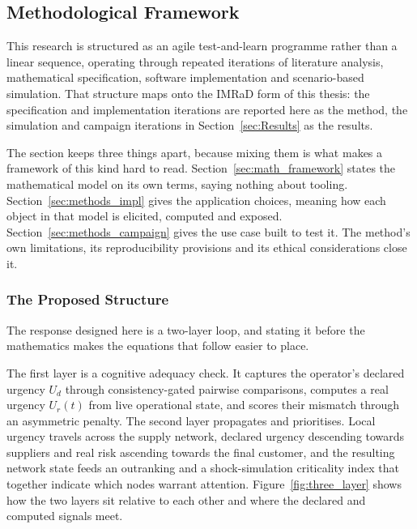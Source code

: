 \subsection{Methodological Framework}
\label{sec:methods_framework}

This research is structured as an agile test-and-learn programme rather than a linear
sequence, operating through repeated iterations of literature analysis, mathematical
specification, software implementation and scenario-based simulation. That structure maps
onto the IMRaD form of this thesis: the specification and implementation iterations are
reported here as the method, the simulation and campaign iterations in
Section~\ref{sec:Results} as the results.

The section keeps three things apart, because mixing them is what makes a framework of this
kind hard to read. Section~\ref{sec:math_framework} states the mathematical model on its own
terms, saying nothing about tooling. Section~\ref{sec:methods_impl} gives the application
choices, meaning how each object in that model is elicited, computed and exposed.
Section~\ref{sec:methods_campaign} gives the use case built to test it. The method's own
limitations, its reproducibility provisions and its ethical considerations close it.

\subsubsection{The Proposed Structure}
\label{sec:methods_axis}

The response designed here is a two-layer loop, and stating it before the mathematics makes
the equations that follow easier to place.

The first layer is a cognitive adequacy check. It captures the operator's declared urgency
$U_d$ through consistency-gated pairwise comparisons, computes a real urgency $U_r(t)$ from
live operational state, and scores their mismatch through an asymmetric penalty. The second
layer propagates and prioritises. Local urgency travels across the supply network, declared
urgency descending towards suppliers and real risk ascending towards the final customer, and
the resulting network state feeds an outranking and a shock-simulation criticality index that
together indicate which nodes warrant attention. Figure~\ref{fig:three_layer} shows how the
two layers sit relative to each other and where the declared and computed signals meet.

